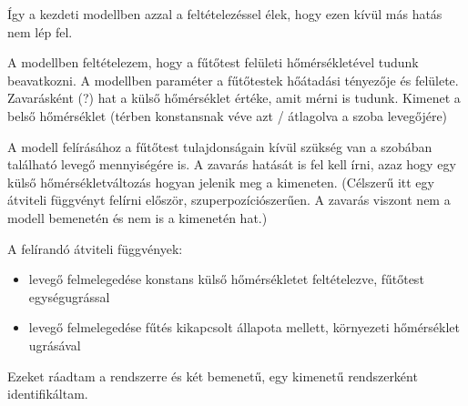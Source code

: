 Így a kezdeti modellben azzal a feltételezéssel élek, hogy ezen kívül más hatás nem lép fel.

A modellben feltételezem, hogy a fűtőtest felületi hőmérsékletével tudunk beavatkozni. A modellben paraméter a fűtőtestek hőátadási tényezője és felülete. Zavarásként (?) hat a külső hőmérséklet értéke, amit mérni is tudunk. Kimenet a belső hőmérséklet (térben konstansnak véve azt / átlagolva a szoba levegőjére)

A modell felírásához a fűtőtest tulajdonságain kívül szükség van a szobában található levegő mennyiségére is. A zavarás hatását is fel kell írni, azaz hogy egy külső hőmérsékletváltozás hogyan jelenik meg a kimeneten. (Célszerű itt egy átviteli függvényt felírni először, szuperpozíciószerűen. A zavarás viszont nem a modell bemenetén és nem is a kimenetén hat.)

A felírandó átviteli függvények:

\begin{itemize}[noitemsep,topsep=0pt,parsep=0pt,partopsep=0pt]
	\item levegő felmelegedése konstans külső hőmérsékletet feltételezve, fűtőtest egységugrással
	\item levegő felmelegedése fűtés kikapcsolt állapota mellett, környezeti hőmérséklet ugrásával
\end{itemize}

Ezeket ráadtam a rendszerre és két bemenetű, egy kimenetű rendszerként identifikáltam.




%
%
%
%
%
%











\pagebreak